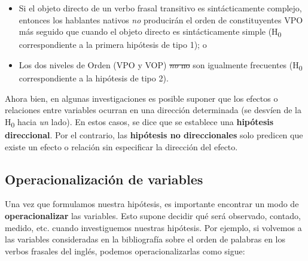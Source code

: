 \documentclass[authoryear,a4paper, 14pt]{scrartcl}
\begin{document}
\begin{itemize}
    \item
      Si el objeto directo de un verbo frasal transitivo es sintácticamente
      complejo, entonces los hablantes nativos \emph{no} producirán el orden
      de constituyentes VPO más seguido que cuando el objeto directo es
      sintácticamente simple (H\textsubscript{0} correspondiente a la
      primera hipótesis de tipo 1); o
    \item
      Los dos niveles de Orden (VPO y VOP) \sout{\emph{no} no} son
      igualmente frecuentes (H\textsubscript{0} correspondiente a la
      hipótesis de tipo 2).
\end{itemize}

Ahora bien, en algunas investigaciones es posible suponer que los
efectos o relaciones entre variables ocurran en una dirección
determinada (se desvíen de la H\textsubscript{0} hacia \emph{un} lado).
En estos casos, se dice que se establece una \textbf{hipótesis
direccional}. Por el contrario, las \textbf{hipótesis no direccionales}
solo predicen que existe un efecto o relación sin especificar la
dirección del efecto.

\hypertarget{operacionalizacion-de-variables}{%
\subsection{Operacionalización de
variables}\label{operacionalizacion-de-variables}}

Una vez que formulamos nuestra hipótesis, es importante encontrar un
modo de \textbf{operacionalizar} las variables. Esto supone decidir qué
será observado, contado, medido, etc. cuando investiguemos nuestras
hipótesis. Por ejemplo, si volvemos a las variables consideradas en la
bibliografía sobre el orden de palabras en los verbos frasales del
inglés, podemos operacionalizarlas como sigue:
\end{document}

